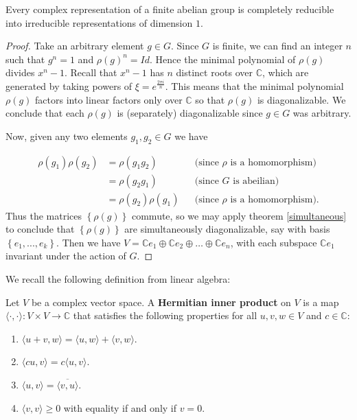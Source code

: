 \begin{thm} Every complex representation of a finite abelian group is completely reducible into irreducible representations of dimension $1$.  
\end {thm}
\begin{proof}
Take an arbitrary element $g \in G$.  Since $G$ is finite, we can find an integer $n$ such that $g^n = 1$ and $\rho(g)^n = Id$.    Hence the minimal polynomial of $\rho(g)$ divides  $x^n -1$.  Recall that $x^n-1$ has $n$ distinct roots over $\mathbb{C}$, which are generated by taking powers of $\xi = e^{\frac{2 \pi i}{n}}$.  This means that the minimal polynomial $\rho(g)$ factors into linear factors only over $\mathbb{C}$ so that $\rho(g)$ is diagonalizable.  We conclude that each $\rho(g)$ is (separately) diagonalizable since $g \in G$ was arbitrary.

Now, given any two elements $g_1, g_2 \in G$ we have 

\begin{align*}
\rho(g_1) \rho(g_2)&= \rho(g_1 g_2)&& \text{(since $\rho$ is a homomorphism)} \\
		&=  \rho(g_2 g_1) && \text{(since $G$ is abeilian)} \\
		&= \rho(g_2) \rho(g_1) && \text{(since $\rho$ is a homomorphism)}.
\end{align*}
Thus the matrices $\left\{ \rho(g)\right\}$ commute, so we may apply theorem \ref{simultaneous} to conclude that $\left\{ \rho(g)\right\}$ are simultaneously diagonalizable, say with basis $\left\{ e_1, ..., e_k \right\}$.  Then we have $V= \mathbb{C}e_1 \oplus \mathbb{C} e_2 \oplus \ldots \oplus \mathbb{C} e_n$, with each subspace $ \mathbb{C}e_1$ invariant under the action of $G$.
\end{proof}

We recall the following definition from linear algebra:
\begin{defn} \label{hip}
Let $V$ be a complex vector space.  A \textbf{Hermitian inner product} on $V$ is a map $\langle \cdot{,}\cdot \rangle \colon  V \times V \to \mathbb{C}$ that satisfies the following properties for all  $u, v, w \in V$ and $c \in \mathbb{C}$:
\begin{enumerate}
\item \label{hip-1}  $\langle u + v, w \rangle = \langle u , w \rangle + \langle v, w \rangle$.
\item \label{hip-2} $\langle c u, v \rangle = c \langle u, v \rangle$.
\item \label{hip-3} $\langle u , v \rangle = \overline{\langle v , u \rangle }$.
\item \label{hip-4} $\langle v, v \rangle \geq 0$ with equality if and only if $v = 0$.
\end{enumerate}
\end{defn}

